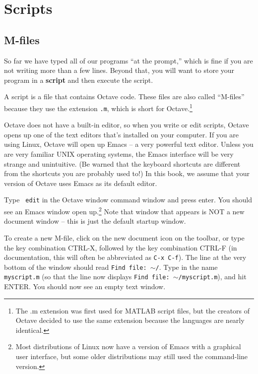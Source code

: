 
\chapter{Scripts}

\section{M-files}

So far we have typed all of our programs ``at the prompt,'' which is
fine if you are not writing more than a few lines. Beyond that,
you will want to store your program in a {\bf script} and then
execute the script.

A script is a file that contains Octave code. These files are
also called ``M-files'' because they use the extension {\tt .m},
which is short for Octave.\footnote{The .m extension was first used for MATLAB
script files, but the creators of Octave decided to use the same extension
because the languages are nearly identical.}

Octave does not have a built-in editor, so when you write or edit scripts,
Octave opens up one of the text editors that's installed on your computer. If
you are using Linux, Octave will open up Emacs -- a very powerful text editor.
Unless you are very familiar UNIX operating systems, the Emacs interface will be
very strange and unintuitive. (Be warned that the keyboard shortcuts are
different from the shortcuts you are probably used to!) In this book, we assume
that your version of Octave uses Emacs as its default editor.

Type {\tt
edit} in the Octave window command window and press enter. You should see an
Emacs window open up.\footnote{Most distributions of Linux now have a version of
Emacs with a graphical user interface, but some older distributions may still
used the command-line version.} Note that window that appears is NOT a new
document window -- this is just the default startup window.

To create a new M-file, click on the new document icon on the
toolbar, or type the key combination CTRL-X,
followed by the key combination CTRL-F (in documentation, this will often be
abbreviated as {\tt C-x C-f}). The line at the very bottom of the window should
read {\tt Find file: $\sim$/}. Type in the name {\tt myscript.m} (so that the
line now displays {\tt Find file: $\sim$/myscript.m}), and hit ENTER. You
should now see an empty text window.

